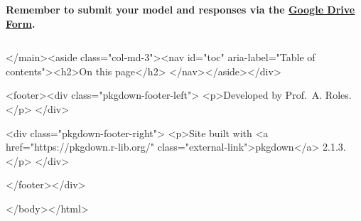 \textbf{Remember to submit your model and responses via the
\href{https://forms.gle/E3QLACX1aA2Q6ist5}{Google Drive Form}.}

\begin{verbatim}
\end{verbatim}
  </main><aside class="col-md-3"><nav id="toc" aria-label="Table of contents"><h2>On this page</h2>
    </nav></aside></div>



    <footer><div class="pkgdown-footer-left">
  <p>Developed by Prof. A. Roles.</p>
</div>

<div class="pkgdown-footer-right">
  <p>Site built with <a href="https://pkgdown.r-lib.org/" class="external-link">pkgdown</a> 2.1.3.</p>
</div>

    </footer></div>





  </body></html>
